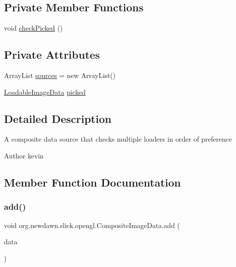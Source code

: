 \subsection*{Private Member Functions}
\begin{DoxyCompactItemize}
\item 
void \mbox{\hyperlink{classorg_1_1newdawn_1_1slick_1_1opengl_1_1_composite_image_data_a1a95487f3cd09ae6bf1458ffa1d433b8}{check\+Picked}} ()
\end{DoxyCompactItemize}
\subsection*{Private Attributes}
\begin{DoxyCompactItemize}
\item 
Array\+List \mbox{\hyperlink{classorg_1_1newdawn_1_1slick_1_1opengl_1_1_composite_image_data_a620f0a2292b907b7a3418d95d91e422c}{sources}} = new Array\+List()
\item 
\mbox{\hyperlink{interfaceorg_1_1newdawn_1_1slick_1_1opengl_1_1_loadable_image_data}{Loadable\+Image\+Data}} \mbox{\hyperlink{classorg_1_1newdawn_1_1slick_1_1opengl_1_1_composite_image_data_a7238cbb20cc08b68a29935b4bc222da7}{picked}}
\end{DoxyCompactItemize}


\subsection{Detailed Description}
A composite data source that checks multiple loaders in order of preference

\begin{DoxyAuthor}{Author}
kevin 
\end{DoxyAuthor}


\subsection{Member Function Documentation}
\mbox{\label{classorg_1_1newdawn_1_1slick_1_1opengl_1_1_composite_image_data_ac36327aa091c87d4ef3426c1b8e476b4}} 
\subsubsection{\texorpdfstring{add()}{add()}}
{\footnotesize\ttfamily void org.\+newdawn.\+slick.\+opengl.\+Composite\+Image\+Data.\+add (\begin{DoxyParamCaption}\item[{\mbox{\hyperlink{interfaceorg_1_1newdawn_1_1slick_1_1opengl_1_1_loadable_image_data}{Loadable\+Image\+Data}}}]{data }\end{DoxyParamCaption})\hspace{0.3cm}{\ttfamily [inline]}}


